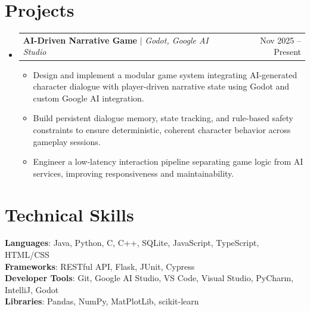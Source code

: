 \documentclass[letterpaper,11pt]{article}
\makeatletter
\newcommand{\resumeItem}[1]{
  \item\small{
    {#1 \vspace{-2pt}}
  }
}
\newcommand{\resumeProjectHeading}[2]{
    \item
    \begin{tabular*}{0.97\textwidth}{l@{\extracolsep{\fill}}r}
      \small#1 & #2 \\
    \end{tabular*}\vspace{-7pt}
}
\newcommand{\resumeSubHeadingListStart}{\begin{itemize}[leftmargin=0.15in, label={}]}
\newcommand{\resumeSubHeadingListEnd}{\end{itemize}}
\newcommand{\resumeItemListStart}{\begin{itemize}}
\newcommand{\resumeItemListEnd}{\end{itemize}\vspace{-5pt}}
\makeatother
\begin{document}
\section{Projects}
    \resumeSubHeadingListStart
      \resumeProjectHeading
          {\textbf{AI-Driven Narrative Game} $|$ \emph{Godot, Google AI Studio}}{Nov 2025 -- Present}
          \resumeItemListStart
            \resumeItem{Design and implement a modular game system integrating AI-generated character dialogue with player-driven narrative state using Godot and custom Google AI integration.}
            \resumeItem{Build persistent dialogue memory, state tracking, and rule-based safety constraints to ensure deterministic, coherent character behavior across gameplay sessions.}
            \resumeItem{Engineer a low-latency interaction pipeline separating game logic from AI services, improving responsiveness and maintainability.}
          \resumeItemListEnd
    \resumeSubHeadingListEnd

\section{Technical Skills}
 \begin{itemize}[leftmargin=0.15in, label={}]
    \small{\item{
     \textbf{Languages}{: Java, Python, C, C++, SQLite, JavaScript, TypeScript, HTML/CSS} \\
     \textbf{Frameworks}{: RESTful API, Flask, JUnit, Cypress} \\
     \textbf{Developer Tools}{: Git, Google AI Studio, VS Code, Visual Studio, PyCharm, IntelliJ, Godot} \\
     \textbf{Libraries}{: Pandas, NumPy, MatPlotLib, scikit-learn}
    }}
 \end{itemize}

\end{document}
